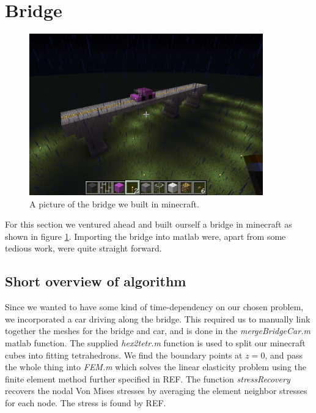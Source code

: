 \section{Bridge}

\begin{figure}
\center
\includegraphics[trim=0cm 5cm 7cm 7cm, clip=true, width=0.9\textwidth]{pic_bridge}
\caption{A picture of the bridge we built in minecraft.}
\label{fig:picBridge}
\end{figure}

For this section we ventured ahead and built ourself a bridge in minecraft as shown in figure \ref{fig:picBridge}. Importing the bridge into matlab were, apart from some tedious work, were quite straight forward.

\subsection{Short overview of algorithm}
Since we wanted to have some kind of time-dependency on our chosen problem, we incorporated a car driving along the bridge. This required us to manually link together the meshes for the bridge and car, and is done in the \textit{mergeBridgeCar.m} matlab function. The supplied \textit{hex2tetr.m} function is used to split our minecraft cubes into fitting tetrahedrons. We find the boundary points at $z = 0$, and pass the whole thing into \textit{FEM.m} which solves the linear elasticity problem using the finite element method further specified in REF. The function \textit{stressRecovery} recovers the nodal Von Mises stresses by averaging the element  neighbor stresses for each node. The stress is found by REF.


